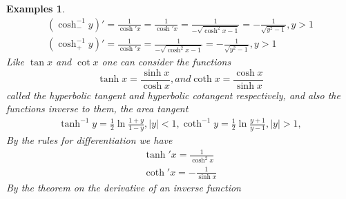 \documentclass[a4paper,12pt]{article} %
\newtheorem{example}{Examples}
\begin{document}
\begin{example}
\[\begin{split}
            \left(\cosh_-^{-1}y\right)' = \frac{1}{\cosh'x} = \frac{1}{\cosh'x} = \frac{1}{-\sqrt{\cosh^2x-1}} = -\frac{1}{\sqrt{y^2-1}}, y > 1\\
            \left(\cosh_+^{-1}y\right)' = \frac{1}{\cosh'x} = \frac{1}{-\sqrt{\cosh^2x-1}} = -\frac{1}{\sqrt{y^2-1}}, y > 1
        \end{split}
        \]
    Like $\tan x$ and $\cot x$ one can consider the functions 
    \[
        \tanh x = \frac{\sinh x}{\cosh x}, and \coth x = \frac{\cosh x}{\sinh x}
        \]
    called the hyperbolic tangent and hyperbolic cotangent respectively, and also 
    the functions inverse to them, the area tangent 
    \[
        \begin{split}
        \tanh^{-1} y = \frac{1}{2}\ln\frac{1+y}{1-y}, |y| < 1,
        \coth^{-1} y = \frac{1}{2}\ln\frac{y+1}{y-1}, |y| > 1,
        \end{split}
        \]
    By the rules for differentiation we have 
    \[
        \begin{split}
            \tanh'x = \frac{1}{\cosh^2x}\\
            \coth'x = -\frac{1}{\sinh x}
        \end{split}
        \]
    By the theorem on the derivative of an inverse function 

\end{example}
\end{document}
